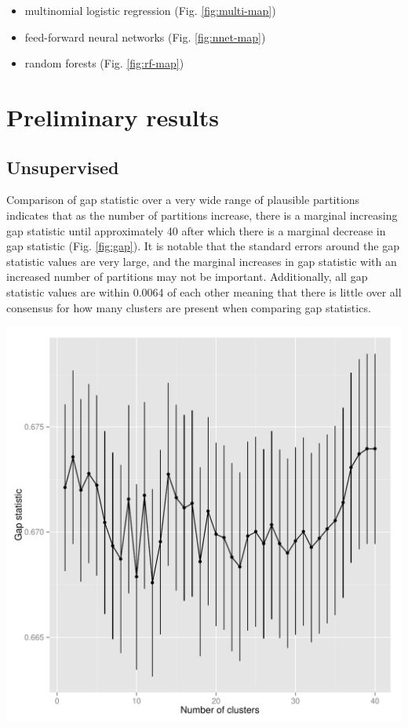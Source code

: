 \documentclass{article}\usepackage{graphicx, color}
\makeatletter
\def\maxwidth{ %
  \ifdim\Gin@nat@width>\linewidth
    \linewidth
  \else
    \Gin@nat@width
  \fi
}
\newenvironment{knitrout}{}{} %
\makeatother
\begin{document}
\begin{itemize}
  \item multinomial logistic regression (Fig. \ref{fig:multi-map})
  \item feed-forward neural networks (Fig. \ref{fig:nnet-map})
  \item random forests (Fig. \ref{fig:rf-map})
\end{itemize}


\section{Preliminary results}
\subsection{Unsupervised}
Comparison of gap statistic over a very wide range of plausible partitions indicates that as the number of partitions increase, there is a marginal increasing gap statistic until approximately 40 after which there is a marginal decrease in gap statistic (Fig. \ref{fig:gap}). It is notable that the standard errors around the gap statistic values are very large, and the marginal increases in gap statistic with an increased number of partitions may not be important. Additionally, all gap statistic values are within 0.0064 of each other meaning that there is little over all consensus for how many clusters are present when comparing gap statistics.

\begin{knitrout}
\color{fgcolor}
\includegraphics[width=\maxwidth]{figure/gap} 

\end{knitrout}
\end{document}
